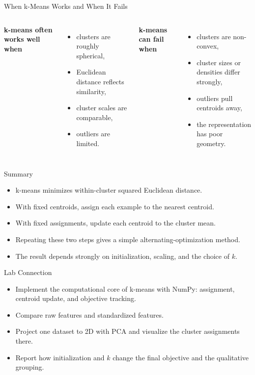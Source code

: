 \begin{frame}{When k-Means Works and When It Fails}
\begin{columns}[T]
\textbf{k-means often works well when}
\begin{itemize}
  \item clusters are roughly spherical,
  \pause
  \item Euclidean distance reflects similarity,
  \pause
  \item cluster scales are comparable,
  \pause
  \item outliers are limited.
\end{itemize}

\pause
{}
\textbf{k-means can fail when}
\begin{itemize}
  \item clusters are non-convex,
  \pause
  \item cluster sizes or densities differ strongly,
  \pause
  \item outliers pull centroids away,
  \pause
  \item the representation has poor geometry.
\end{itemize}
\end{columns}
\end{frame}

\begin{frame}{Summary}
\begin{itemize}
  \item k-means minimizes within-cluster squared Euclidean distance.
  \item With fixed centroids, assign each example to the nearest centroid.
  \item With fixed assignments, update each centroid to the cluster mean.
  \item Repeating these two steps gives a simple alternating-optimization method.
  \item The result depends strongly on initialization, scaling, and the choice of $k$.
\end{itemize}
\end{frame}

\begin{frame}{Lab Connection}
\begin{itemize}
  \item Implement the computational core of k-means with NumPy: assignment, centroid update, and objective tracking.
  \item Compare raw features and standardized features.
  \item Project one dataset to 2D with PCA and visualize the cluster assignments there.
  \item Report how initialization and $k$ change the final objective and the qualitative grouping.
\end{itemize}
\end{frame}
